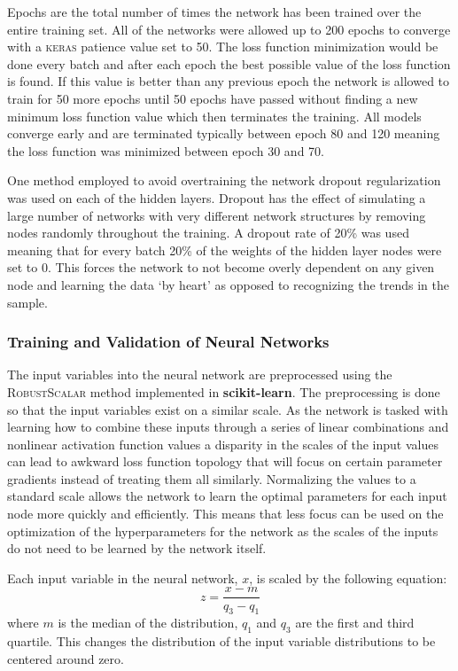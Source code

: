 Epochs are the total number of times the network has been trained over the entire training set.  All of the networks were allowed up to 200 epochs to converge with a \textsc{keras} patience value set to 50.  The loss function minimization would be done every batch and after each epoch the best possible value of the loss function is found.  If this value is better than any previous epoch the network is allowed to train for 50 more epochs until 50 epochs have passed without finding a new minimum loss function value which then terminates the training.  All models converge early and are terminated typically between epoch 80 and 120 meaning the loss function was minimized between epoch 30 and 70.  

One method employed to avoid overtraining the network dropout regularization was used on each of the hidden layers.  Dropout has the effect of simulating a large number of networks with very different network structures by removing nodes randomly throughout the training. A dropout rate of 20\% was used meaning that for every batch 20\% of the weights of the hidden layer nodes were set to 0.  This forces the network to not become overly dependent on any given node and learning the data `by heart' as opposed to recognizing the trends in the sample. 

\subsubsection{Training and Validation of Neural Networks}

The input variables into the neural network are preprocessed using the \textsc{RobustScalar} method implemented in \textbf{scikit-learn}\cite{ScikitLearn}.  The preprocessing is done so that the input variables exist on a similar scale.  As the network is tasked with learning how to combine these inputs through a series of linear combinations and nonlinear activation function values a disparity in the scales of the input values can lead to awkward loss function topology that will focus on certain parameter gradients instead of treating them all similarly.  Normalizing the values to a standard scale allows the network to learn the optimal parameters for each input node more quickly and efficiently.  This means that less focus can be used on the optimization of the hyperparameters for the network as the scales of the inputs do not need to be learned by the network itself.

Each input variable in the neural network, $x$, is scaled by the following equation:
\[ z = \frac{x - m }{q_3 - q_1} \]
where $m$ is the median of the distribution, $q_1$ and $q_3$ are the first and third quartile.  This changes the distribution of the input variable distributions to be centered around zero.

